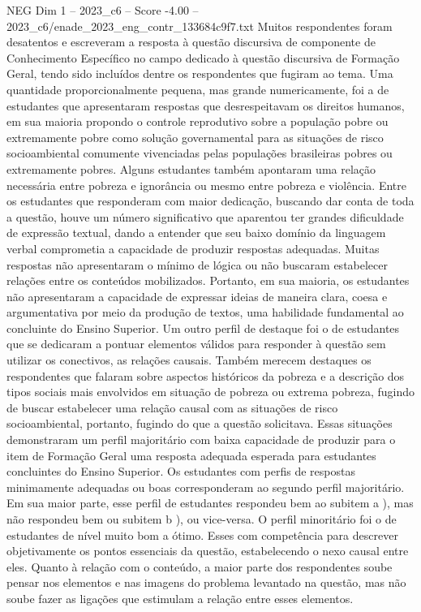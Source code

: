 \begin{textsample}{NEG Dim 1 – 2023\_c6 – Score -4.00 – 2023\_c6/enade\_2023\_eng\_contr\_133684c9f7.txt}
Muitos respondentes foram desatentos e escreveram a resposta à questão discursiva de componente de Conhecimento Específico no campo dedicado à questão discursiva de Formação Geral, tendo sido incluídos dentre os respondentes que fugiram ao tema.
Uma quantidade proporcionalmente pequena, mas grande numericamente, foi a de estudantes que apresentaram respostas que desrespeitavam os direitos humanos, em sua maioria propondo o controle reprodutivo sobre a população pobre ou extremamente pobre como solução governamental para as situações de risco socioambiental comumente vivenciadas pelas populações brasileiras pobres ou extremamente pobres.
Alguns estudantes também apontaram uma relação necessária entre pobreza e ignorância ou mesmo entre pobreza e violência.
Entre os estudantes que responderam com maior dedicação, buscando dar conta de toda a questão, houve um número significativo que aparentou ter grandes dificuldade de expressão textual, dando a entender que seu baixo domínio da linguagem verbal comprometia a capacidade de produzir respostas adequadas.
Muitas respostas não apresentaram o mínimo de lógica ou não buscaram estabelecer relações entre os conteúdos mobilizados.
Portanto, em sua maioria, os estudantes não apresentaram a capacidade de expressar ideias de maneira clara, coesa e argumentativa por meio da produção de textos, uma habilidade fundamental ao concluinte do Ensino Superior.
Um outro perfil de destaque foi o de estudantes que se dedicaram a pontuar elementos válidos para responder à questão sem utilizar os conectivos, as relações causais.
Também merecem destaques os respondentes que falaram sobre aspectos históricos da pobreza e a descrição dos tipos sociais mais envolvidos em situação de pobreza ou extrema pobreza, fugindo de buscar estabelecer uma relação causal com as situações de risco socioambiental, portanto, fugindo do que a questão solicitava.
Essas situações demonstraram um perfil majoritário com baixa capacidade de produzir para o item de Formação Geral uma resposta adequada esperada para estudantes concluintes do Ensino Superior.
Os estudantes com perfis de respostas minimamente adequadas ou boas corresponderam ao segundo perfil majoritário.
Em sua maior parte, esse perfil de estudantes respondeu bem ao subitem a ), mas não respondeu bem ou subitem b ), ou vice-versa.
O perfil minoritário foi o de estudantes de nível muito bom a ótimo.
Esses com competência para descrever objetivamente os pontos essenciais da questão, estabelecendo o nexo causal entre eles.
Quanto à relação com o conteúdo, a maior parte dos respondentes soube pensar nos elementos e nas imagens do problema levantado na questão, mas não soube fazer as ligações que estimulam a relação entre esses elementos.

\end{textsample}
